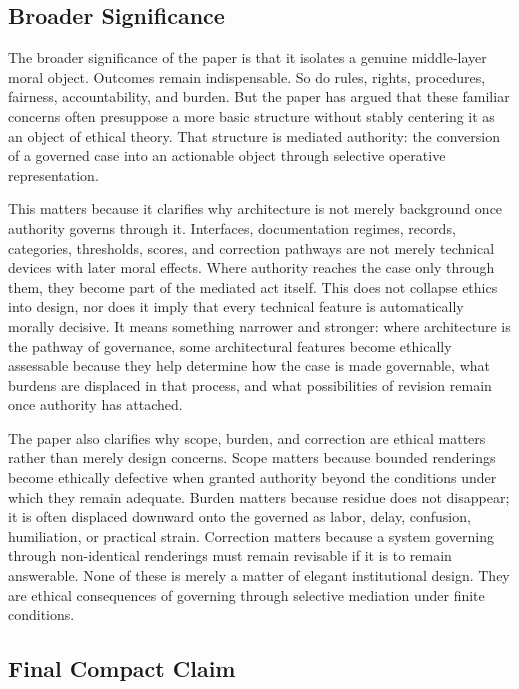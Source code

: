 \documentclass[11pt]{article}
\begin{document}
\subsection{Broader Significance}

The broader significance of the paper is that it isolates a genuine middle-layer moral object. Outcomes remain indispensable. So do rules, rights, procedures, fairness, accountability, and burden. But the paper has argued that these familiar concerns often presuppose a more basic structure without stably centering it as an object of ethical theory. That structure is mediated authority: the conversion of a governed case into an actionable object through selective operative representation.

This matters because it clarifies why architecture is not merely background once authority governs through it. Interfaces, documentation regimes, records, categories, thresholds, scores, and correction pathways are not merely technical devices with later moral effects. Where authority reaches the case only through them, they become part of the mediated act itself. This does not collapse ethics into design, nor does it imply that every technical feature is automatically morally decisive. It means something narrower and stronger: where architecture is the pathway of governance, some architectural features become ethically assessable because they help determine how the case is made governable, what burdens are displaced in that process, and what possibilities of revision remain once authority has attached.

The paper also clarifies why scope, burden, and correction are ethical matters rather than merely design concerns. Scope matters because bounded renderings become ethically defective when granted authority beyond the conditions under which they remain adequate. Burden matters because residue does not disappear; it is often displaced downward onto the governed as labor, delay, confusion, humiliation, or practical strain. Correction matters because a system governing through non-identical renderings must remain revisable if it is to remain answerable. None of these is merely a matter of elegant institutional design. They are ethical consequences of governing through selective mediation under finite conditions.

\subsection{Final Compact Claim}
\end{document}
